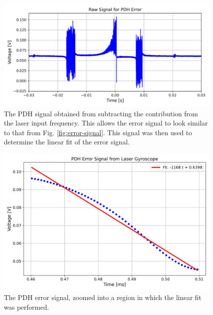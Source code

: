 \documentclass[a4paper]{report}
\numberwithin{equation}{section}
\begin{document}
\begin{figure}[h!]
	\centering
	\includegraphics[width=0.8\columnwidth]{raw_err_sig_comb.png}
	\caption{The PDH signal obtained from subtracting the contribution from the laser input frequency. This allows the error 
	signal to look similar to that from Fig. \ref{fig:error-signal}. This signal was then used to determine the linear fit of the 
	error signal.}
	\label{fig:pdh_err_combined}
\end{figure}

\begin{figure}[h!]
	\centering
	\includegraphics[width=0.8\columnwidth]{pdh_err_filt_fit_zoomed.png}
	\caption{The PDH error signal, zoomed into a region in which the linear fit was performed.}
	\label{fig:pdh_err_fit_zoomed}
\end{figure}
\end{document}
